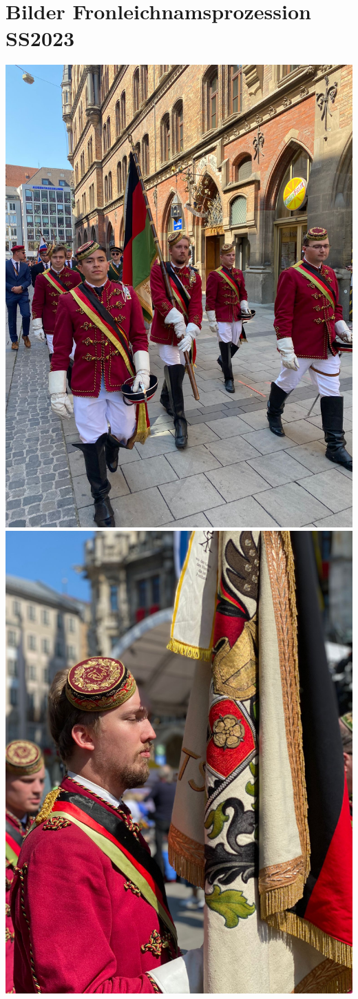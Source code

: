 \section{Bilder Fronleichnamsprozession SS2023}




\begin{figurehere}
		
			\includegraphics[width=.45\linewidth]{Bilder/fronleichnam/fronleichnam (1).jpg}
		   \includegraphics[width=.45\linewidth]{Bilder/fronleichnam/fronleichnam (2).jpg}
		   

\end{figurehere}
